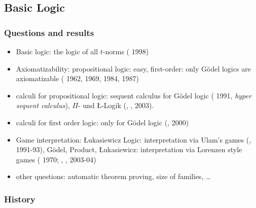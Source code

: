 \documentclass[aspectratio=169]%
  {beamer}
\newcommand{\cutin}[1]{%
\frame[c]{\begin{center}{\Large\bf\color{blue}#1}\end{center}}}
\begin{document}
\subsection{Basic Logic}
\begin{frame}
  \frametitle{Questions and results}
  \begin{itemize}
    \item Basic logic: the logic of all $t$-norms ( 1998)
    \item Axiomatizability: propositional logic: easy, first-order:
      only Gödel logics are axiomatizable ( 1962,
       1969,  1984, 
      1987) 
    \item calculi for propositional logic: sequent calculus for Gödel
      logic ( 1991, \emph{hyper sequent calculus}), $\Pi$- und
      \L-Logik (, , 
      2003). 
    \item calculi for first order logic: only for Gödel logic
      (,  2000) 
    \item Game interpretation: \L ukasiewicz Logic: interpretation via
      Ulam's games (, 1991-93),
      Gödel, Product, \L ukasiewicz: interpretation via Lorenzen style
      games ( 1970; ,
      ,  2003-04)
    \item other questions: automatic theorem proving, size of
      families, \dots
  \end{itemize}
\end{frame}


\cutin{Gödel Logics}

\def\aaaa#1#2#3#4#5#6#7{%
  \only<#6->{\draw (#1, #3) -- (#1, #2);
  \draw (#1, #3) node[anchor=south] {\alt<#6>{\alert{#4}}{#4}};
  \draw (#1, #2) node[anchor=north] {\alt<#6>{\alert{#5}}{#5}};}
  \only<#6>{\draw (0,-3) node[anchor=south west] {#7};}
}
\begin{frame}
  \frametitle{History}
  \begin{center}
  \end{center}
\end{frame}
\end{document}
